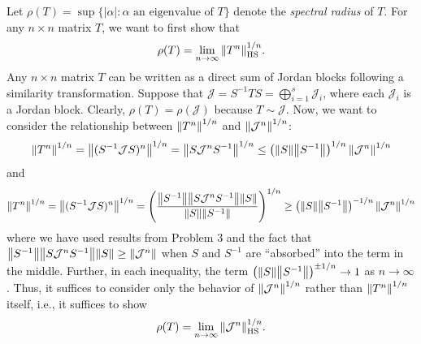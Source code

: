 \documentclass{article}
\begin{document}
Let $\rho(T) = \sup \{|\alpha| : \alpha\text{ an eigenvalue of  } T\}$ denote the \textit{spectral radius} of $T$. For any $n\times n $ matrix $T$, we want to first show that
\begin{align*}
\rho(T) = \lim\limits_{n\to \infty} \norm{T^n}^{1/n}_{\text{HS}}.
\end{align*}
Any $n\times n$ matrix $T$ can be written as a direct sum of Jordan blocks following a similarity transformation. Suppose that $\mathcal{J} = S^{-1}TS = \bigoplus^s_{i=1}\mathcal{J}_i$, where each $\mathcal{J}_i$ is a Jordan block. Clearly, $\rho(T) = \rho(\mathcal{J})$ because $T\sim \mathcal{J}$. Now, we want to consider the relationship between $\norm{T^n}^{1/n}$ and $\norm{\mathcal{J}^n}^{1/n}$:
\begin{align*}
\norm{T^n}^{1/n} = \norm{(S^{-1}\mathcal{J}S)^n}^{1/n} = \norm{ S \mathcal{J}^n S^{-1}}^{1/n} \leq \left( \norm{S} \norm{S^{-1}}\right)^{1/n} \norm{\mathcal{J}^n}^{1/n}  
\end{align*} 
and
\begin{align*}
\norm{T^n}^{1/n} = \norm{(S^{-1}\mathcal{J}S)^n}^{1/n} = \left( \frac{\norm{S^{-1}}\norm{ S\mathcal{J}^{n}S^{-1}} \norm{S}}{\norm{S} \norm{S^{-1}}}\right)^{1/n} \geq \left( \norm{S} \norm{S^{-1}}\right)^{-1/n} \norm{\mathcal{J}^n}^{1/n} 
\end{align*}
where we have used results from Problem 3 and the fact that $\norm{S^{-1}}\norm{S\mathcal{J}^nS^{-1}}\norm{S} \geq \norm{\mathcal{J}^n}$ when $S$ and $S^{-1}$ are ``absorbed'' into the term in the middle. Further, in each inequality, the term $\left( \norm{S} \norm{S^{-1}}\right)^{\pm 1/n}  \to 1 $  as $n\to \infty$. Thus, it suffices to consider only the behavior of $\norm{\mathcal{J}^n}^{1/n}$ rather than $\norm{T^n}^{1/n}$ itself, i.e., it suffices to show 
\begin{align*}
\rho(T) = \lim\limits_{n\to \infty} \norm{\mathcal{J}^n}^{1/n}_{\text{HS}}.
\end{align*}
\end{document}
